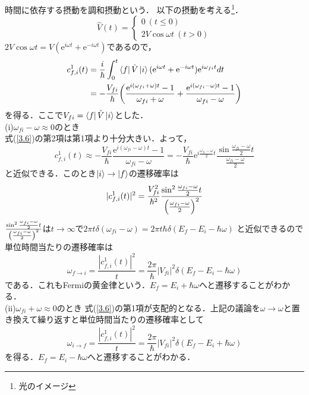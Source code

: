 \documentclass{report}
\begin{document}
  時間に依存する摂動を調和摂動という．
  以下の摂動を考える\footnote{光のイメージ}．
  \begin{equation}
    \hat{V}(t)=
    \begin{cases}
    0\ (t\le0)\\
    2V\cos\omega t\ (t>0)
    \end{cases}
  \end{equation}
  $2V\cos\omega t=V(\mathrm{e}^{i\omega t}+\mathrm{e}^{-i\omega t})$であるので，
  \begin{align}
    c^1_{f,i}(t)&=\frac{i}{\hbar}\int_{0}^{t}\bra{f}\hat{V}\ket{i}(\mathrm{e}^{i\omega t}+\mathrm{e}^{-i\omega t})\mathrm{e}^{i\omega_{fi}t}dt\\
    \label{3.6}
    &=-\frac{V_{fi}}{\hbar}\qty(\frac{\mathrm{e}^{i(\omega_{fi}+\omega)t}-1}{\omega_{fi}+\omega}+\frac{\mathrm{e}^{i(\omega_{fi}-\omega)t}-1}{\omega_{fi}-\omega})
  \end{align}
  を得る．ここで$V_{fi}=\bra{f}\hat{V}\ket{i}$とした．\\
  (i)$\omega_{fi}-\omega\approx0$のとき\\
  式(\ref{3.6})の第2項は第1項より十分大きい．よって，
  \begin{equation}
    c_{f,i}^1(t)\approx-\frac{V_{fi}}{\hbar}\frac{\mathrm{e}^{i(\omega_{fi}-\omega)t}-1}{\omega_{fi}-\omega}=-\frac{V_{fi}}{\hbar}\mathrm{e}^{i\frac{\omega_{fi}-\omega}{2}t}\frac{\sin\frac{\omega_{fi}-\omega}{2}t}{\frac{\omega_{fi}-\omega}{2}}
  \end{equation}
  と近似できる．このとき$\ket{i}\to\ket{f}$の遷移確率は
  \begin{equation}
    |c_{f,i}^1(t)|^2=\frac{V_{fi}^2}{\hbar^2}\frac{\sin^2\frac{\omega_{fi}-\omega}{2}t}{\qty(\frac{\omega_{fi}-\omega}{2})^2}
  \end{equation}
  $\frac{\sin^2\frac{\omega_{fi}-\omega}{2}t}{\qty(\frac{\omega_{fi}-\omega}{2})^2}$は$t\to\infty$で$2\pi t\delta(\omega_{fi}-\omega)=2\pi t\hbar\delta(E_f-E_i-\hbar\omega)$
  と近似できるので
  単位時間当たりの遷移確率は
  \begin{equation}
    \omega_{f\to i}=\frac{|c_{f,i}^1(t)|^2}{t}=\frac{2\pi}{\hbar}|V_{fi}|^2\delta(E_f-E_i-\hbar\omega)
  \end{equation}
  である．これもFermiの黄金律という．$E_f=E_i+\hbar\omega$へと遷移することがわかる．\\
  (ii)$\omega_{fi}+\omega\approx0$のとき
  式(\ref{3.6})の第1項が支配的となる．上記の議論を$\omega\to\omega$と置き換えて繰り返すと単位時間当たりの遷移確率として
  \begin{equation}
    \omega_{i\to f}=\frac{|c_{f,i}^1(t)|^2}{t}=\frac{2\pi}{\hbar}|V_{fi}|^2\delta(E_f-E_i+\hbar\omega)
  \end{equation}
  を得る．$E_f=E_i-\hbar\omega$へと遷移することがわかる．
\end{document}
